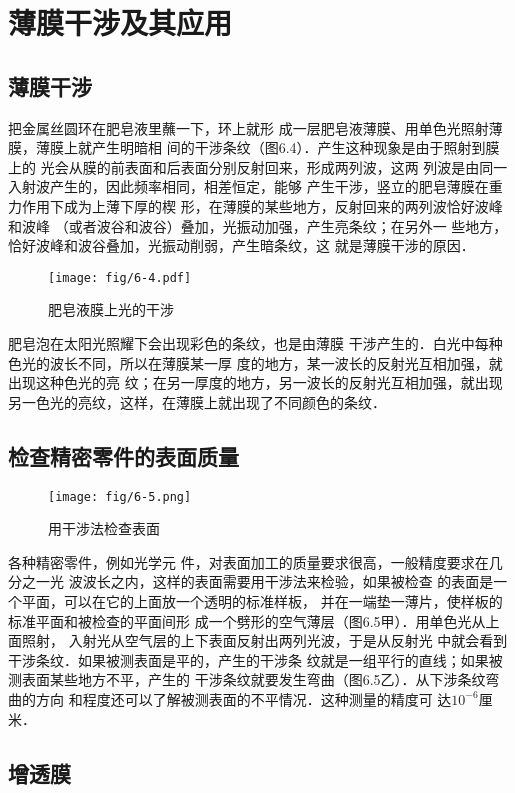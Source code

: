 \section{薄膜干涉及其应用}
\subsection{薄膜干涉}
把金属丝圆环在肥皂液里蘸一下，环上就形
成一层肥皂液薄膜、用单色光照射薄膜，薄膜上就产生明暗相
间的干涉条纹（图6.4）．产生这种现象是由于照射到膜上的
光会从膜的前表面和后表面分别反射回来，形成两列波，这两
列波是由同一入射波产生的，因此频率相同，相差恒定，能够
产生干涉，竖立的肥皂薄膜在重力作用下成为上薄下厚的楔
形，在薄膜的某些地方，反射回来的两列波恰好波峰和波峰
（或者波谷和波谷）叠加，光振动加强，产生亮条纹；在另外一
些地方，恰好波峰和波谷叠加，光振动削弱，产生暗条纹，这
就是薄膜干涉的原因．
\begin{figure}[htp]\centering
    \texttt{[image: fig/6-4.pdf]}
    \caption{肥皂液膜上光的干涉}
    \end{figure}


肥皂泡在太阳光照耀下会出现彩色的条纹，也是由薄膜
干涉产生的．白光中每种色光的波长不同，所以在薄膜某一厚
度的地方，某一波长的反射光互相加强，就出现这种色光的亮
纹；在另一厚度的地方，另一波长的反射光互相加强，就出现
另一色光的亮纹，这样，在薄膜上就出现了不同颜色的条纹．

\subsection{检查精密零件的表面质量}
\begin{figure}[htp]\centering
    \texttt{[image: fig/6-5.png]}
    \caption{用干涉法检查表面}
    \end{figure}

各种精密零件，例如光学元
件，对表面加工的质量要求很高，一般精度要求在几分之一光
波波长之内，这样的表面需要用干涉法来检验，如果被检查
的表面是一个平面，可以在它的上面放一个透明的标准样板，
并在一端垫一薄片，使样板的标准平面和被检查的平面间形
成一个劈形的空气薄层（图6.5甲）．用单色光从上面照射，
入射光从空气层的上下表面反射出两列光波，于是从反射光
中就会看到干涉条纹．如果被测表面是平的，产生的干涉条
纹就是一组平行的直线；如果被测表面某些地方不平，产生的
干涉条纹就要发生弯曲（图6.5乙）．从下涉条纹弯曲的方向
和程度还可以了解被测表面的不平情况．这种测量的精度可
达$10^{-6}$厘米．

\subsection{增透膜}

